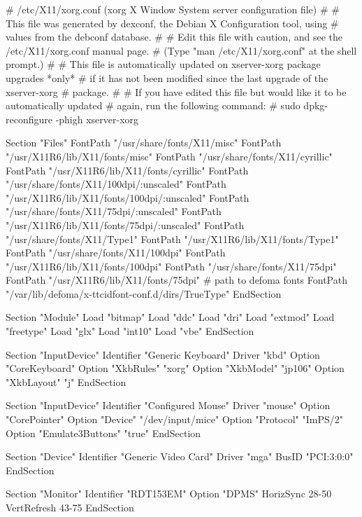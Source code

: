 \documentclass[mingoth,a4paper]{jsarticle}
\begin{document}
\begin{commandline}
# /etc/X11/xorg.conf (xorg X Window System server configuration file)
#
# This file was generated by dexconf, the Debian X Configuration tool, using
# values from the debconf database.
#
# Edit this file with caution, and see the /etc/X11/xorg.conf manual page.
# (Type "man /etc/X11/xorg.conf" at the shell prompt.)
#
# This file is automatically updated on xserver-xorg package upgrades *only*
# if it has not been modified since the last upgrade of the xserver-xorg
# package.
#
# If you have edited this file but would like it to be automatically updated
# again, run the following command:
#   sudo dpkg-reconfigure -phigh xserver-xorg

Section "Files"
	FontPath	"/usr/share/fonts/X11/misc"
	FontPath	"/usr/X11R6/lib/X11/fonts/misc"
	FontPath	"/usr/share/fonts/X11/cyrillic"
	FontPath	"/usr/X11R6/lib/X11/fonts/cyrillic"
	FontPath	"/usr/share/fonts/X11/100dpi/:unscaled"
	FontPath	"/usr/X11R6/lib/X11/fonts/100dpi/:unscaled"
	FontPath	"/usr/share/fonts/X11/75dpi/:unscaled"
	FontPath	"/usr/X11R6/lib/X11/fonts/75dpi/:unscaled"
	FontPath	"/usr/share/fonts/X11/Type1"
	FontPath	"/usr/X11R6/lib/X11/fonts/Type1"
	FontPath	"/usr/share/fonts/X11/100dpi"
	FontPath	"/usr/X11R6/lib/X11/fonts/100dpi"
	FontPath	"/usr/share/fonts/X11/75dpi"
	FontPath	"/usr/X11R6/lib/X11/fonts/75dpi"
	# path to defoma fonts
	FontPath	"/var/lib/defoma/x-ttcidfont-conf.d/dirs/TrueType"
EndSection

Section "Module"
	Load	"bitmap"
	Load	"ddc"
	Load	"dri"
	Load	"extmod"
	Load	"freetype"
	Load	"glx"
	Load	"int10"
	Load	"vbe"
EndSection

Section "InputDevice"
	Identifier	"Generic Keyboard"
	Driver		"kbd"
	Option		"CoreKeyboard"
	Option		"XkbRules"	"xorg"
	Option		"XkbModel"	"jp106"
	Option		"XkbLayout"	"j"
EndSection

Section "InputDevice"
	Identifier	"Configured Mouse"
	Driver		"mouse"
	Option		"CorePointer"
	Option		"Device"		"/dev/input/mice"
	Option		"Protocol"		"ImPS/2"
	Option		"Emulate3Buttons"	"true"
EndSection

Section "Device"
	Identifier	"Generic Video Card"
	Driver		"mga"
	BusID		"PCI:3:0:0"
EndSection

Section "Monitor"
	Identifier	"RDT153EM"
	Option		"DPMS"
	HorizSync	28-50
	VertRefresh	43-75
EndSection

\end{commandline}
\end{document}
